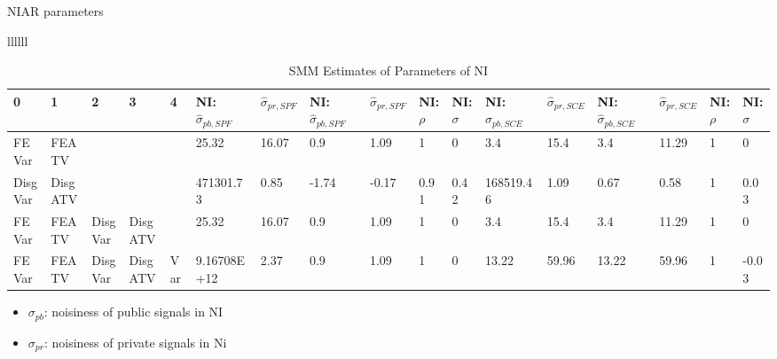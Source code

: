 \documentclass{beamer}
\begin{document}
\begin{frame}{NIAR parameters}
	\begin{table}
		\centering
		\caption{SMM Estimates of Parameters of NI}
		\label{SMM_Est_NI_Table}
		\begin{tabular}{llllll}
		\begin{tabular}{lllllllllllllllll}
			\hline 
			0       & 1       & 2       & 3       & 4   & NI: $\hat\sigma_{pb,SPF}$ & $\hat\sigma_{pr,SPF}$ & NI: $\hat\sigma_{pb,SPF}$ & $\hat\sigma_{pr,SPF}$ & NI: $\rho$ & NI: $\sigma$ & NI: $\hat\sigma_{pb,SCE}$ & $\hat\sigma_{pr,SCE}$ & NI: $\hat\sigma_{pb,SCE}$ & $\hat\sigma_{pr,SCE}$ & NI: $\rho$ & NI: $\sigma$ \\
				\hline 
			FEVar   & FEATV   &         &         &     & 25.32                     & 16.07                 & 0.9                       & 1.09                  & 1          & 0            & 3.4                       & 15.4                  & 3.4                       & 11.29                 & 1          & 0            \\
			DisgVar & DisgATV &         &         &     & 471301.73                 & 0.85                  & -1.74                     & -0.17                 & 0.91       & 0.42         & 168519.46                 & 1.09                  & 0.67                      & 0.58                  & 1          & 0.03         \\
			FEVar   & FEATV   & DisgVar & DisgATV &     & 25.32                     & 16.07                 & 0.9                       & 1.09                  & 1          & 0            & 3.4                       & 15.4                  & 3.4                       & 11.29                 & 1          & 0            \\
			FEVar   & FEATV   & DisgVar & DisgATV & Var & 9.16708E+12               & 2.37                  & 0.9                       & 1.09                  & 1          & 0            & 13.22                     & 59.96                 & 13.22                     & 59.96                 & 1          & -0.03       \\
			\hline 
		\end{tabular}
		\end{tabular}
	\end{table}	
	\begin{itemize}
		\item $\sigma_{pb}$: noisiness of public signals in NI
		\item $\sigma_{pr}$: noisiness of private signals in Ni 
	\end{itemize}
\end{frame}
\end{document}
